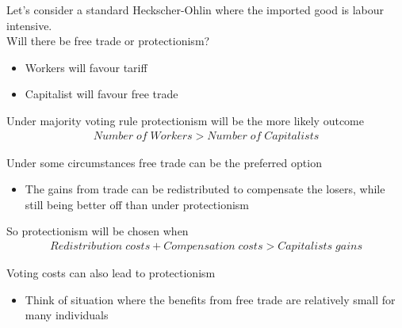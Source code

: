 \documentclass{beamer}
\begin{document}
\begin{frame}
  Let's consider a standard Heckscher-Ohlin where the imported good is labour intensive.\\
  \bigskip
  Will there be free trade or protectionism?  
\end{frame}

\begin{frame}
\begin{itemize}
  \item Workers will favour tariff
  \item Capitalist will favour free trade
\end{itemize}
\medskip  
  Under majority voting rule protectionism will be the more likely outcome
  \begin{align*}
    Number\;of\;Workers > Number\;of\;Capitalists
  \end{align*}    
\end{frame}

\begin{frame}
Under some circumstances free trade can be the preferred option
  \begin{itemize}
    \item The gains from trade can be redistributed to compensate the losers, while still being better off than under protectionism
  \end{itemize}  
  \medskip
  So protectionism will be chosen when
  \begin{align*}
    Redistribution\;costs + Compensation\;costs > Capitalists\;gains 
  \end{align*}
\end{frame}

\begin{frame}
  Voting costs can also lead to protectionism
  \begin{itemize}
    \item Think of situation where the benefits from free trade are relatively small for many individuals
  \end{itemize}  
\end{frame}
\end{document}
